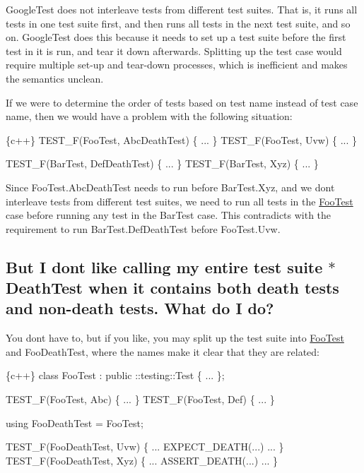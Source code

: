 Google\+Test does not interleave tests from different test suites. That is, it runs all tests in one test suite first, and then runs all tests in the next test suite, and so on. Google\+Test does this because it needs to set up a test suite before the first test in it is run, and tear it down afterwards. Splitting up the test case would require multiple set-\/up and tear-\/down processes, which is inefficient and makes the semantics unclean.

If we were to determine the order of tests based on test name instead of test case name, then we would have a problem with the following situation\+:


\begin{DoxyCode}
\{c++\}
TEST\_F(FooTest, AbcDeathTest) \{ ... \}
TEST\_F(FooTest, Uvw) \{ ... \}

TEST\_F(BarTest, DefDeathTest) \{ ... \}
TEST\_F(BarTest, Xyz) \{ ... \}
\end{DoxyCode}


Since {\ttfamily Foo\+Test.\+Abc\+Death\+Test} needs to run before {\ttfamily Bar\+Test.\+Xyz}, and we don\textquotesingle{}t interleave tests from different test suites, we need to run all tests in the {\ttfamily \mbox{\hyperlink{classFooTest}{Foo\+Test}}} case before running any test in the {\ttfamily Bar\+Test} case. This contradicts with the requirement to run {\ttfamily Bar\+Test.\+Def\+Death\+Test} before {\ttfamily Foo\+Test.\+Uvw}.

\subsection*{But I don\textquotesingle{}t like calling my entire test suite {\ttfamily $\ast$\+Death\+Test} when it contains both death tests and non-\/death tests. What do I do?}

You don\textquotesingle{}t have to, but if you like, you may split up the test suite into {\ttfamily \mbox{\hyperlink{classFooTest}{Foo\+Test}}} and {\ttfamily Foo\+Death\+Test}, where the names make it clear that they are related\+:


\begin{DoxyCode}
\{c++\}
class FooTest : public ::testing::Test \{ ... \};

TEST\_F(FooTest, Abc) \{ ... \}
TEST\_F(FooTest, Def) \{ ... \}

using FooDeathTest = FooTest;

TEST\_F(FooDeathTest, Uvw) \{ ... EXPECT\_DEATH(...) ... \}
TEST\_F(FooDeathTest, Xyz) \{ ... ASSERT\_DEATH(...) ... \}
\end{DoxyCode}


